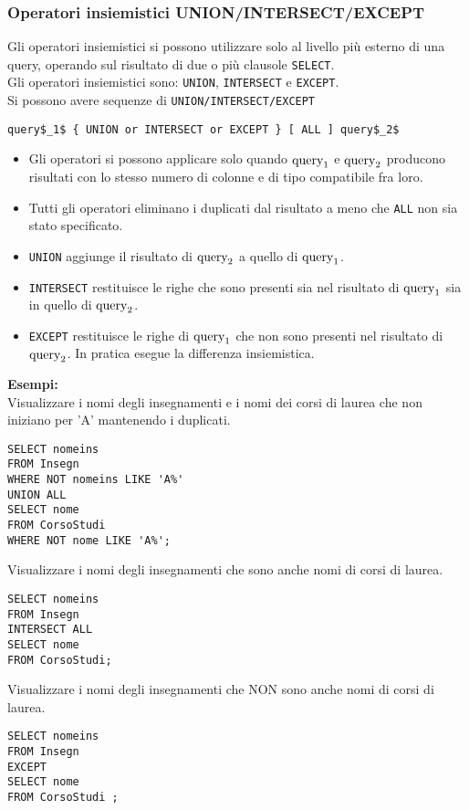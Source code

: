 \documentclass[a4paper, 10pt, titlepage]{article}
\begin{document}
	\subsubsection{Operatori insiemistici UNION/INTERSECT/EXCEPT}
		Gli operatori insiemistici si possono utilizzare solo al livello più esterno
		di una query, operando sul risultato di due o più clausole \lstinline|SELECT|.\\
		Gli operatori insiemistici sono: \lstinline|UNION|, \lstinline|INTERSECT| e \lstinline|EXCEPT|.\\
		Si possono avere sequenze di \lstinline|UNION/INTERSECT/EXCEPT|
		\begin{lstlisting}[mathescape]
query$_1$ { UNION or INTERSECT or EXCEPT } [ ALL ] query$_2$
		\end{lstlisting}
		\begin{itemize}
				\item Gli operatori si possono applicare solo quando $ \textup{query}_1 $ e 
				$ \textup{query}_2 $ producono risultati con lo stesso numero di colonne e di tipo compatibile
				fra loro.
				\item Tutti gli operatori eliminano i duplicati dal risultato a meno che \lstinline|ALL| non
				sia stato specificato.
				\item \lstinline|UNION| aggiunge il risultato di $ \textup{query}_2 $ a quello di 
				$ \textup{query}_1 $.
				\item \lstinline|INTERSECT| restituisce le righe che sono presenti sia nel risultato di
				$ \textup{query}_1 $ sia in quello di $ \textup{query}_2 $.
				\item \lstinline|EXCEPT| restituisce le righe di $ \textup{query}_1 $ che non sono presenti nel risultato
				di $ \textup{query}_2 $. In pratica esegue la differenza insiemistica.
			\end{itemize}
		\textbf{Esempi: }\\
		Visualizzare i nomi degli insegnamenti e i nomi dei corsi di laurea che non
		iniziano per ’A’ mantenendo i duplicati.
		\begin{lstlisting}
SELECT nomeins
FROM Insegn
WHERE NOT nomeins LIKE 'A%'
UNION ALL
SELECT nome
FROM CorsoStudi
WHERE NOT nome LIKE 'A%';
		\end{lstlisting} \medskip
		Visualizzare i nomi degli insegnamenti che sono anche nomi di corsi di
		laurea.
		\begin{lstlisting}
SELECT nomeins
FROM Insegn
INTERSECT ALL
SELECT nome
FROM CorsoStudi;
		\end{lstlisting} \medskip
		Visualizzare i nomi degli insegnamenti che NON sono anche nomi di corsi di
		laurea.
		\begin{lstlisting}
SELECT nomeins
FROM Insegn
EXCEPT
SELECT nome
FROM CorsoStudi ;
		\end{lstlisting}
	
\end{document}
